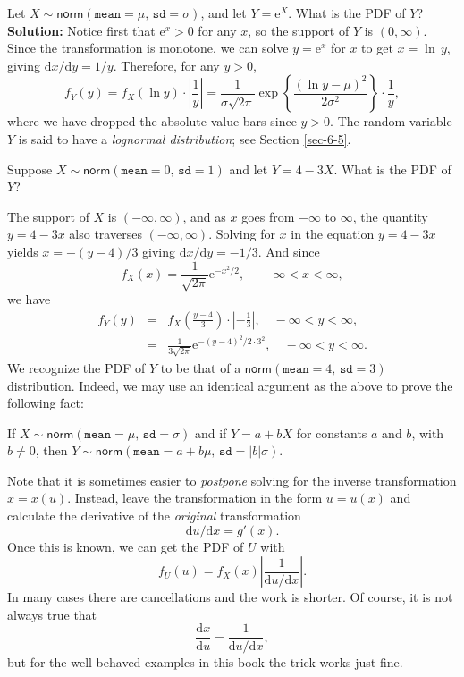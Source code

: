 \label{exa-lnorm-transformation} Let
\(X\sim\mathsf{norm}(\mathtt{mean}=\mu,\,\mathtt{sd}=\sigma)\), and
let \(Y=\mathrm{e}^{X}\). What is the PDF of \(Y\)?  \textbf{Solution:}
Notice first that \(\mathrm{e}^{x}>0\) for any \(x\), so the support
of \(Y\) is \((0,\infty)\). Since the transformation is monotone, we
can solve \(y=\mathrm{e}^{x}\) for \(x\) to get \(x=\ln\, y\), giving
\(\mathrm{d} x/\mathrm{d} y=1/y\). Therefore, for any \(y>0\), \[
f_{Y}(y)=f_{X}(\ln
y)\cdot\left|\frac{1}{y}\right|=\frac{1}{\sigma\sqrt{2\pi}}\exp\left\{
\frac{(\ln y-\mu)^{2}}{2\sigma^{2}}\right\} \cdot\frac{1}{y}, \] where
we have dropped the absolute value bars since \(y>0\). The random
variable \(Y\) is said to have a \emph{lognormal distribution}; see Section
\ref{sec-6-5}.


\label{exa-lin-trans-norm} Suppose
\(X\sim\mathsf{norm}(\mathtt{mean}=0,\,\mathtt{sd}=1)\) and let
\(Y=4-3X\). What is the PDF of \(Y\)?


The support of \(X\) is \((-\infty,\infty)\), and as \(x\) goes from
\(-\infty\) to \(\infty\), the quantity \(y=4-3x\) also traverses
\((-\infty,\infty)\). Solving for \(x\) in the equation \(y=4-3x\)
yields \(x=-(y-4)/3\) giving \(\mathrm{d} x/\mathrm{d} y=-1/3\). And
since \[ f_{X}(x)=\frac{1}{\sqrt{2\pi}}\mathrm{e}^{-x^{2}/2}, \quad
-\infty < x < \infty , \] we have
\begin{eqnarray*}
f_{Y}(y) & = & f_{X}\left(\frac{y-4}{3}\right)\cdot\left|-\frac{1}{3}\right|,\quad -\infty < y < \infty,\\
 & = & \frac{1}{3\sqrt{2\pi}}\mathrm{e}^{-(y-4)^{2}/2\cdot3^{2}},\quad -\infty < y < \infty.
\end{eqnarray*}
We recognize the PDF of \(Y\) to be that of a
\(\mathsf{norm}(\mathtt{mean}=4,\,\mathtt{sd}=3)\)
distribution. Indeed, we may use an identical argument as the above to
prove the following fact:

\begin{fact}
\label{fac-lin-trans-norm-is-norm} If
\(X\sim\mathsf{norm}(\mathtt{mean}=\mu,\,\mathtt{sd}=\sigma)\) and if
\(Y=a+bX\) for constants \(a\) and \(b\), with \(b\neq0\), then
\(Y\sim\mathsf{norm}(\mathtt{mean}=a+b\mu,\,\mathtt{sd}=|b|\sigma)\).
\end{fact}

Note that it is sometimes easier to \emph{postpone} solving for the inverse
transformation \(x=x(u)\). Instead, leave the transformation in the
form \(u=u(x)\) and calculate the derivative of the \emph{original}
transformation
\begin{equation}
\mathrm{d} u/\mathrm{d} x=g'(x).
\end{equation}
Once this is known, we can get the PDF of \(U\) with
\begin{equation}
f_{U}(u)=f_{X}(x)\left|\frac{1}{\mathrm{d} u/\mathrm{d} x}\right|.
\end{equation}
In many cases there are cancellations and the work is shorter. Of course, it is not always true that
\begin{equation}
\label{eq-univ-jacob-recip}
\frac{\mathrm{d} x}{\mathrm{d} u}=\frac{1}{\mathrm{d} u/\mathrm{d} x},
\end{equation}
but for the well-behaved examples in this book the trick works just fine.

